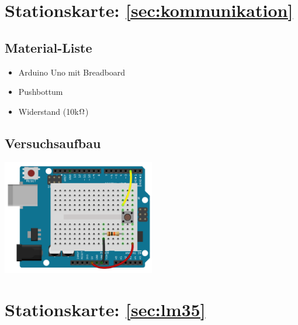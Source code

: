 \section*{Stationskarte: \ref{sec:kommunikation} }

\margininfo{}
\begin{multicols}{2}
\subsection*{Material-Liste}
\begin{itemize}
  \item Arduino Uno mit Breadboard
  \item Pushbottum
  \item Widerstand (10k$\Omega$)
\end{itemize}


\vfill\null 
\columnbreak

\subsection*{Versuchsaufbau}

\includegraphics[width=0.5\textwidth]{Kapitel1/Bilder/digitalreadserial2}
\end{multicols}




\section*{Stationskarte: \ref{sec:lm35} }

